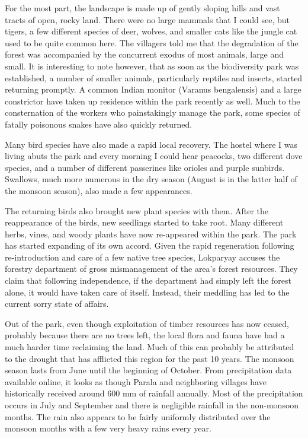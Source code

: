 \documentclass{report}
\begin{document}
For the most part, the landscape is made up of gently sloping hills and vast tracts of open, rocky land. There were no large mammals that I could see, but tigers, a few different species of deer, wolves, and smaller cats like the jungle cat used to be quite common here. The villagers told me that the degradation of the forest was accompanied by the concurrent exodus of most animals, large and small. It is interesting to note however, that as soon as the biodiversity park was established, a number of smaller animals, particularly reptiles and insects, started returning promptly. A common Indian monitor (Varanus bengalensis) and a large constrictor have taken up residence within the park recently as well. Much to the consternation of the workers who painstakingly manage the park, some species of fatally poisonous snakes have also quickly returned.

Many bird species have also made a rapid local recovery. The hostel where I was living abuts the park and every morning I could hear peacocks, two different dove species, and a number of different passerines like orioles and purple sunbirds. Swallows, much more numerous in the dry season (August is in the latter half of the monsoon season), also made a few appearances.

The returning birds also brought new plant species with them. After the reappearance of the birds, new seedlings started to take root. Many different herbs, vines, and woody plants have now re-appeared within the park. The park has started expanding of its own accord. Given the rapid regeneration following re-introduction and care of a few native tree species, Lokparyay accuses the forestry department of gross mismanagement of the area's forest resources. They claim that following independence, if the department had simply left the forest alone, it would have taken care of itself. Instead, their meddling has led to the current sorry state of affairs.

Out of the park, even though exploitation of timber resources has now ceased, probably because there are no trees left, the local flora and fauna have had a much harder time reclaiming the land. Much of this can probably be attributed to the drought that has afflicted this region for the past 10 years. The monsoon season lasts from June until the beginning of October. From precipitation data available online, it looks as though Parala and neighboring villages have historically received around 600 mm of rainfall annually. Most of the precipitation occurs in July and September and there is negligible rainfall in the non-monsoon months. The rain also appears to be fairly uniformly distributed over the monsoon months with a few very heavy rains every year.
\end{document}
